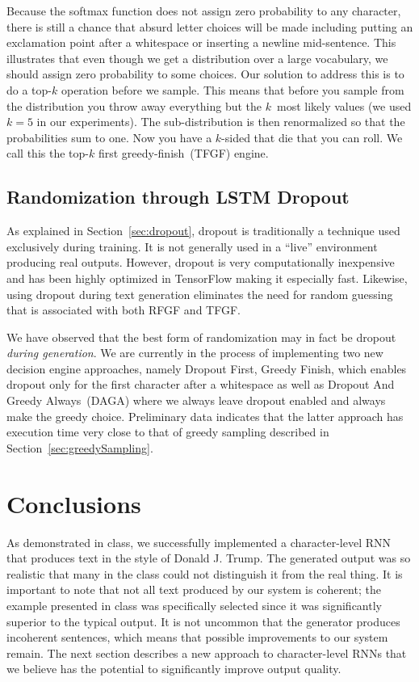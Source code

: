 \documentclass{article}
\begin{document}
Because the softmax function does not assign zero probability to any character, there is still a chance that absurd letter choices will be made including putting an exclamation point after a whitespace or inserting a newline mid-sentence.  This illustrates that even though we get a distribution over a large vocabulary, we should assign zero probability to some choices. Our solution to address this is to do a top-$k$ operation before we sample. This means that before you sample from the distribution you throw away everything but the $k$~most likely values (we used $k=5$ in our experiments). The sub-distribution is then renormalized so that the probabilities sum to one. Now you have a $k$-sided that die that you can roll. We call this the top-$k$ first greedy-finish~(TFGF) engine.


\subsection{Randomization through LSTM Dropout}

As explained in Section~\ref{sec:dropout}, dropout is traditionally a technique used exclusively during training.  It is not generally used in a ``live'' environment producing real outputs.  However, dropout is very computationally inexpensive and has been highly optimized in TensorFlow making it especially fast.  Likewise, using dropout during text generation eliminates the need for random guessing that is associated with both RFGF and TFGF.

We have observed that the best form of randomization may in fact be dropout \textit{during generation}.  We are currently in the process of implementing two new decision engine approaches, namely Dropout First, Greedy Finish, which enables dropout only for the first character after a whitespace as well as Dropout And Greedy Always~(DAGA) where we always leave dropout enabled and always make the greedy choice.  Preliminary data indicates that the latter approach has execution time very close to that of greedy sampling described in Section~\ref{sec:greedySampling}.

\section{Conclusions}

As demonstrated in class, we successfully implemented a character-level RNN that produces text in the style of Donald J. Trump.  The generated output was so realistic that many in the class could not distinguish it from the real thing.  It is important to note that not all text produced by our system is coherent; the example presented in class was specifically selected since it was significantly superior to the typical output.  It is not uncommon that the generator produces incoherent sentences, which means that possible improvements to our system remain.  The next section describes a new approach to character-level RNNs that we believe has the potential to significantly improve output quality.
\end{document}
